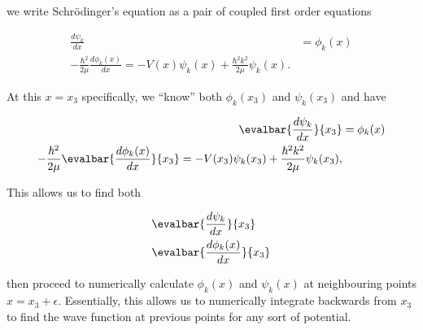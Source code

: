 we write Schr\"{o}dinger's equation as a pair of coupled first order equations

\begin{align}\label{eqn:qmTwoL21:570}
\frac{d\psi_k}{dx} &= \phi_k(x) \\
-\frac{\hbar^2}{2 \mu} \frac{d\phi_k(x)}{dx} = - V(x) \psi_k(x) + \frac{\hbar^2 k^2}{2\mu} \psi_k(x).
\end{align}

At this $x = x_3$ specifically, we ``know'' both $\phi_k(x_3)$ and $\psi_k(x_3)$ and have

\begin{align}\label{eqn:qmTwoL21:590}
\evalbar{\frac{d\psi_k}{dx}}{x_3} &= \phi_k(x) \\
-\frac{\hbar^2}{2 \mu} \evalbar{\frac{d\phi_k(x)}{dx}}{x_3} = 
- V(x_3) \psi_k(x_3) + \frac{\hbar^2 k^2}{2\mu} \psi_k(x_3),
\end{align}

This allows us to find both

\begin{align}\label{eqn:qmTwoL21:610}
&\evalbar{\frac{d\psi_k}{dx}}{x_3} \\
&\evalbar{\frac{d\phi_k(x)}{dx}}{x_3} 
\end{align}

then proceed to numerically calculate $\phi_k(x)$ and $\psi_k(x)$ at neighbouring points $x = x_3 + \epsilon$.  Essentially, this allows us to numerically integrate backwards from $x_3$ to find the wave function at previous points for any sort of potential.

\EndArticle
